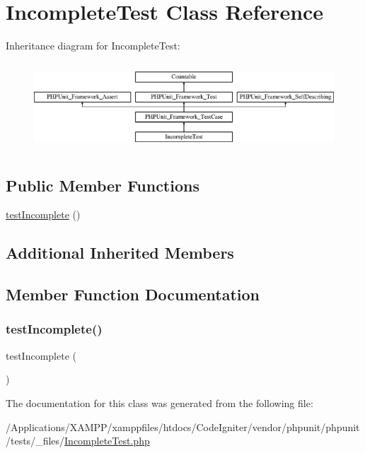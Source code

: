 \hypertarget{class_incomplete_test}{}\section{Incomplete\+Test Class Reference}
\label{class_incomplete_test}
Inheritance diagram for Incomplete\+Test\+:\begin{figure}[H]
\begin{center}
\leavevmode
\includegraphics[height=3.303835cm]{class_incomplete_test}
\end{center}
\end{figure}
\subsection*{Public Member Functions}
\begin{DoxyCompactItemize}
\item 
\mbox{\hyperlink{class_incomplete_test_a5c46571a4bc9b8ca1d821a760e81654b}{test\+Incomplete}} ()
\end{DoxyCompactItemize}
\subsection*{Additional Inherited Members}


\subsection{Member Function Documentation}
\mbox{\label{class_incomplete_test_a5c46571a4bc9b8ca1d821a760e81654b}} 
\subsubsection{\texorpdfstring{test\+Incomplete()}{testIncomplete()}}
{\footnotesize\ttfamily test\+Incomplete (\begin{DoxyParamCaption}{ }\end{DoxyParamCaption})}



The documentation for this class was generated from the following file\+:\begin{DoxyCompactItemize}
\item 
/\+Applications/\+X\+A\+M\+P\+P/xamppfiles/htdocs/\+Code\+Igniter/vendor/phpunit/phpunit/tests/\+\_\+files/\mbox{\hyperlink{tests_2__files_2_incomplete_test_8php}{Incomplete\+Test.\+php}}\end{DoxyCompactItemize}
